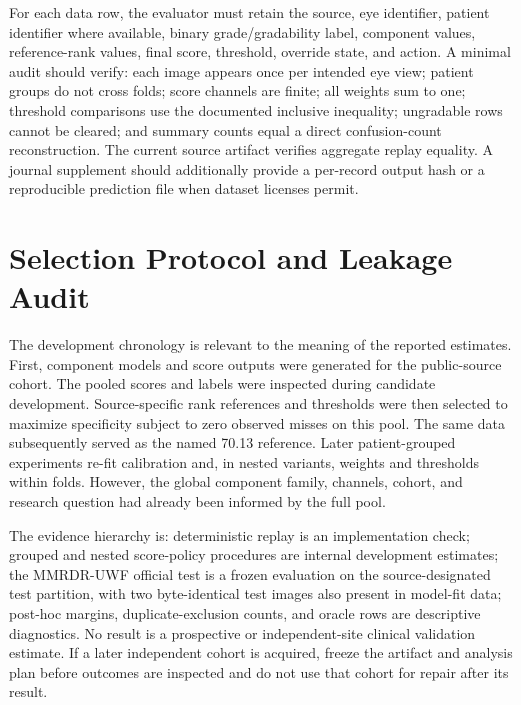 \documentclass{ieeeaccess}
\begin{document}
For each data row, the evaluator must retain the source, eye identifier, patient identifier where available, binary grade/gradability label, component values, reference-rank values, final score, threshold, override state, and action. A minimal audit should verify: each image appears once per intended eye view; patient groups do not cross folds; score channels are finite; all weights sum to one; threshold comparisons use the documented inclusive inequality; ungradable rows cannot be cleared; and summary counts equal a direct confusion-count reconstruction. The current source artifact verifies aggregate replay equality. A journal supplement should additionally provide a per-record output hash or a reproducible prediction file when dataset licenses permit.

\section{Selection Protocol and Leakage Audit}
The development chronology is relevant to the meaning of the reported estimates. First, component models and score outputs were generated for the public-source cohort. The pooled scores and labels were inspected during candidate development. Source-specific rank references and thresholds were then selected to maximize specificity subject to zero observed misses on this pool. The same data subsequently served as the named 70.13 reference. Later patient-grouped experiments re-fit calibration and, in nested variants, weights and thresholds within folds. However, the global component family, channels, cohort, and research question had already been informed by the full pool.

The evidence hierarchy is: deterministic replay is an implementation check; grouped and nested score-policy procedures are internal development estimates; the MMRDR-UWF official test is a frozen evaluation on the source-designated test partition, with two byte-identical test images also present in model-fit data; post-hoc margins, duplicate-exclusion counts, and oracle rows are descriptive diagnostics. No result is a prospective or independent-site clinical validation estimate. If a later independent cohort is acquired, freeze the artifact and analysis plan before outcomes are inspected and do not use that cohort for repair after its result.
\end{document}
